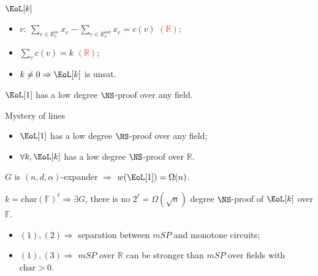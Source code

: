 \begin{frame}{$\EoL[k]$}
    \begin{minipage}{0.5 \linewidth}
        
    \end{minipage}%
    \begin{minipage}{0.5 \linewidth}
        \pause
        \pause
        \begin{itemize}
            \item $v: ~ \sum\limits_{e \in E^{in}_v} x_{e} - \sum\limits_{e \in E^{out}_v} x_{e} = c(v)$
                \textcolor{red}{$(\mathbb{R})$};
            \item $\sum\limits_{v} c(v) = k$ \textcolor{red}{$(\mathbb{R})$};
            \item $k \neq 0 \Rightarrow \EoL[k]$ is unsat. 
        \end{itemize}
    \end{minipage}

    \pause
    \begin{lemma}
        $\EoL[1]$ has a low degree $\NS$-proof over any field.
    \end{lemma}
\end{frame}

\begin{frame}{Mystery of lines}

    \begin{lemma}[1]
        \begin{itemize}
            \item $\EoL[1]$ has a low degree $\NS$-proof over any field;
            \item $\forall k, \EoL[k]$ has a low degree $\NS$-proof over $\mathbb{R}$.
        \end{itemize}
    \end{lemma}

    \pause

    \begin{lemma}[2]
        $G$ is $(n, d, \alpha)$-expander $\Rightarrow$ $w(\EoL[1]) = \Omega(n)$.
    \end{lemma}

    \pause

    \begin{lemma}[3]
        $k = \mathrm{char}(\mathbb{F})^{\ell} \Rightarrow \exists G$, there is no $2^{\ell} =
        \Omega(\sqrt{n})$ degree $\NS$-proof of $\EoL[k]$ over $\mathbb{F}$.
    \end{lemma}

    \begin{itemize}
        \item $(1), (2) \Rightarrow$ separation between $mSP$ and monotone circuits;
        \item $(1), (3) \Rightarrow$ $mSP$ over $\mathbb{R}$ can be stronger than $mSP$ over fields with
            $\mathrm{char} > 0$. 
    \end{itemize}

\end{frame}


